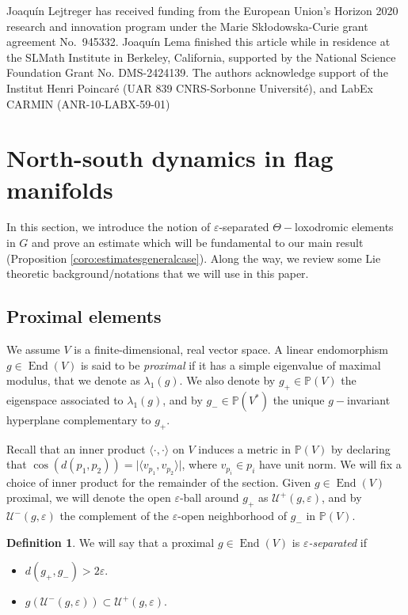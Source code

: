 \documentclass{amsart}
\DeclareMathOperator{\End}{End}
\theoremstyle{remark}
\theoremstyle{definition}
\newtheorem{defi}[thm]{Definition}
\begin{document}
Joaqu\'in Lejtreger has received funding from the European Union’s Horizon 2020 research and innovation program under the Marie Sk\l{}odowska-Curie grant agreement No.\ 945332. Joaqu\'in Lema finished this article while in residence at the SLMath Institute in Berkeley, California, supported by the National Science Foundation Grant No. DMS-2424139. The authors acknowledge support of the Institut Henri Poincaré (UAR
839 CNRS-Sorbonne Université), and LabEx CARMIN (ANR-10-LABX-59-01)


\section{North-south dynamics in flag manifolds}
\label{sec:epsilon}

In this section, we introduce the notion of $\varepsilon$-separated $\Theta-$loxodromic elements in $G$ and prove an estimate which will be fundamental to our main result (Proposition \ref{coro:estimatesgeneralcase}).
Along the way, we review some Lie theoretic background/notations that we will use in this paper.

\subsection{Proximal elements}
\label{subsec:proximal}
We assume $V$ is a finite-dimensional, real vector space.
A linear endomorphism $g \in \End (V)$ is said to be \emph{proximal} if it has a simple eigenvalue of maximal modulus, that we denote as $\lambda_1 (g)$.
We also denote by $g_+ \in \mathbb{P} (V)$ the eigenspace associated to $\lambda_1 (g)$, and by $g_- \in \mathbb{P} (V^*)$ the unique $g-$invariant hyperplane complementary to $g_+$.

Recall that an inner product $\langle \cdot,\cdot \rangle$ on $V$ induces a metric in $\mathbb{P} (V)$ by declaring that $\cos (d(p_1,p_2)) = \vert \langle v_{p_1},v_{p_2}\rangle \vert$, where $v_{p_i} \in p_i$ have unit norm.
We will fix a choice of inner product for the remainder of the section.
Given $g \in \End (V)$ proximal, we will denote the open $\varepsilon$-ball around $g_+$ as $\mathcal{U}^+ (g,\varepsilon)$, and by $\mathcal{U}^- (g,\varepsilon)$ the complement of the $\varepsilon$-open neighborhood of $g_-$ in $\mathbb{P} (V)$.

\begin{defi}
 We will say that a proximal $g \in \End (V)$ is \emph{$\varepsilon$-separated} if
    \begin{itemize}
        \item $d (g_+,g_-) > 2 \varepsilon.$
        \item $g (\mathcal{U}^- (g,\varepsilon)) \subset \mathcal{U}^+ (g,\varepsilon)$.
    \end{itemize}
\end{defi}
\end{document}
